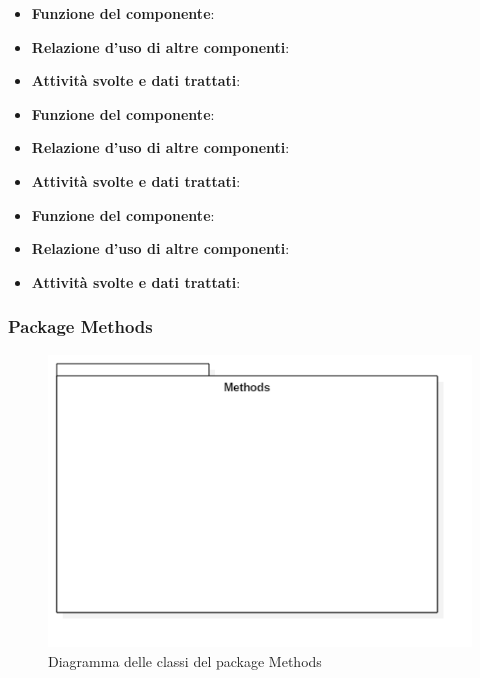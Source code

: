 
\begin{itemize}
	\item\textbf{Funzione del componente}: 
	\item\textbf{Relazione d'uso di altre componenti}: 
	\item\textbf{Attività svolte e dati trattati}:
\end{itemize}


\begin{itemize}
	\item\textbf{Funzione del componente}: 
	\item\textbf{Relazione d'uso di altre componenti}: 
	\item\textbf{Attività svolte e dati trattati}:
\end{itemize}


\begin{itemize}
	\item\textbf{Funzione del componente}: 
	\item\textbf{Relazione d'uso di altre componenti}: 
	\item\textbf{Attività svolte e dati trattati}:
\end{itemize}

\subsubsection{Package Methods}
\begin{figure}[h!]
\begin{center}
	\includegraphics[scale=0.65]{../images/MethodsClass.png}
	\caption{Diagramma delle classi del package Methods}
\end{center}
\end{figure}

